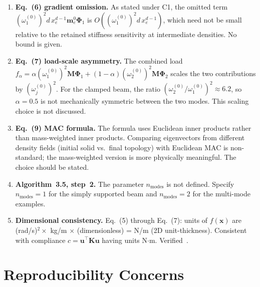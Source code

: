 \documentclass[11pt,a4paper]{article}
\begin{document}
\begin{enumerate}[label=\textbf{E\arabic*.},nosep]

\item \textbf{Eq.~(6) gradient omission.} As stated under C1, the omitted term
  $(\omega_1^{(0)})^2 d\, x_e^{d-1} \mathbf{m}_e^0 \boldsymbol{\Phi}_1$ is
  $O((\omega_1^{(0)})^2 d\, x_e^{d-1})$, which need not be small relative to
  the retained stiffness sensitivity at intermediate densities. No bound is given.

\item \textbf{Eq.~(7) load-scale asymmetry.}
  The combined load $f_\alpha = \alpha(\omega_1^{(0)})^2\mathbf{M}\boldsymbol{\Phi}_1
  + (1-\alpha)(\omega_2^{(0)})^2\mathbf{M}\boldsymbol{\Phi}_2$ scales the two
  contributions by $(\omega_j^{(0)})^2$. For the clamped beam, the ratio
  $(\omega_2^{(0)}/\omega_1^{(0)})^2\approx6.2$, so $\alpha=0.5$ is not mechanically
  symmetric between the two modes. This scaling choice is not discussed.

\item \textbf{Eq.~(9) MAC formula.} The formula uses Euclidean inner products rather
  than mass-weighted inner products. Comparing eigenvectors from different density
  fields (initial solid vs.\ final topology) with Euclidean MAC is non-standard; the
  mass-weighted version is more physically meaningful. The choice should be stated.

\item \textbf{Algorithm~3.5, step~2.} The parameter $n_\text{modes}$ is not defined.
  Specify $n_\text{modes}=1$ for the simply supported beam and $n_\text{modes}=2$ for
  the multi-mode examples.

\item \textbf{Dimensional consistency.} Eq.~(5) through Eq.~(7): units of
  $f(\mathbf{x})$ are (rad/s)$^2 \times$ kg/m $\times$ (dimensionless) = N/m (2D
  unit-thickness). Consistent with compliance $c = \mathbf{u}^\top\mathbf{K}\mathbf{u}$
  having units N$\cdot$m. Verified~\checkmark.

\end{enumerate}


\section{Reproducibility Concerns}
\end{document}
